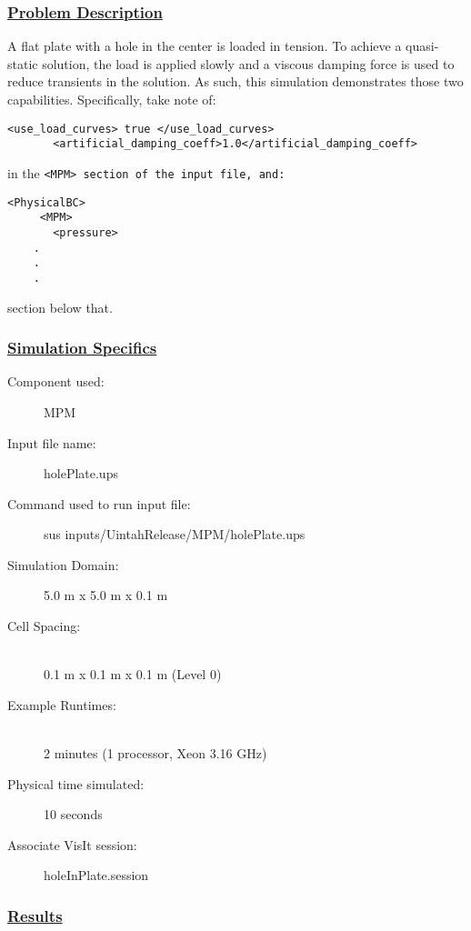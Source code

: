 \subsubsection*{\underline{Problem Description}}
A flat plate with a hole in the center is loaded in tension.  To achieve a
quasi-static solution, the load is applied slowly and a viscous damping force
is used to reduce transients in the solution.  As such, this simulation
demonstrates those two capabilities.  Specifically, take note of:
\begin{Verbatim}[fontsize=\footnotesize]
       <use_load_curves> true </use_load_curves>
       <artificial_damping_coeff>1.0</artificial_damping_coeff>
\end{Verbatim}
in the \tt <MPM> \normalfont section of the input file, and:
\begin{Verbatim}[fontsize=\footnotesize]
   <PhysicalBC>
     <MPM>
       <pressure>
	.
	.
	.
\end{Verbatim}
section below that.

 
\subsubsection*{\underline{Simulation Specifics}}
\begin{description} 
\item [Component used:] \hfill MPM
\item [Input file name:] \hfill holePlate.ups
\item [Command used to run input file:]\hfill sus inputs/UintahRelease/MPM/holePlate.ups
\item [Simulation Domain:]\hfill 5.0 m x 5.0 m x 0.1 m

\item [Cell Spacing:]\hfill \\ 
  0.1 m x 0.1 m x 0.1 m (Level 0)

\item [Example Runtimes:] \hfill \\
 2 minutes  (1 processor, Xeon 3.16 GHz)\\

\item [Physical time simulated:] \hfill 10 seconds

\item [Associate VisIt session:] \hfill holeInPlate.session

\end{description}

\subsubsection*{\underline{Results}}

